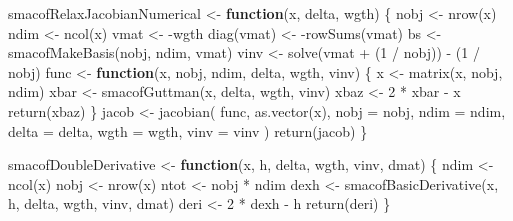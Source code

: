 \documentclass[
  12pt,
  letterpaper,
  DIV=11,
  numbers=noendperiod]{scrartcl}
\newenvironment{Shaded}{\begin{snugshade}}{\end{snugshade}}
\newcommand{\AttributeTok}[1]{\textcolor[rgb]{0.40,0.45,0.13}{#1}}
\newcommand{\ControlFlowTok}[1]{\textcolor[rgb]{0.00,0.23,0.31}{\textbf{#1}}}
\newcommand{\DecValTok}[1]{\textcolor[rgb]{0.68,0.00,0.00}{#1}}
\newcommand{\FunctionTok}[1]{\textcolor[rgb]{0.28,0.35,0.67}{#1}}
\newcommand{\NormalTok}[1]{\textcolor[rgb]{0.00,0.23,0.31}{#1}}
\newcommand{\OtherTok}[1]{\textcolor[rgb]{0.00,0.23,0.31}{#1}}
\newcommand{\SpecialCharTok}[1]{\textcolor[rgb]{0.37,0.37,0.37}{#1}}
\begin{document}
\begin{Shaded}
\begin{Highlighting}[]
\NormalTok{smacofRelaxJacobianNumerical }\OtherTok{\textless{}{-}} \ControlFlowTok{function}\NormalTok{(x, delta, wgth) \{}
\NormalTok{  nobj }\OtherTok{\textless{}{-}} \FunctionTok{nrow}\NormalTok{(x)}
\NormalTok{  ndim }\OtherTok{\textless{}{-}} \FunctionTok{ncol}\NormalTok{(x)}
\NormalTok{  vmat }\OtherTok{\textless{}{-}} \SpecialCharTok{{-}}\NormalTok{wgth}
  \FunctionTok{diag}\NormalTok{(vmat) }\OtherTok{\textless{}{-}} \SpecialCharTok{{-}}\FunctionTok{rowSums}\NormalTok{(vmat)}
\NormalTok{  bs }\OtherTok{\textless{}{-}} \FunctionTok{smacofMakeBasis}\NormalTok{(nobj, ndim, vmat)}
\NormalTok{  vinv }\OtherTok{\textless{}{-}} \FunctionTok{solve}\NormalTok{(vmat }\SpecialCharTok{+}\NormalTok{ (}\DecValTok{1} \SpecialCharTok{/}\NormalTok{ nobj)) }\SpecialCharTok{{-}}\NormalTok{ (}\DecValTok{1} \SpecialCharTok{/}\NormalTok{ nobj)}
\NormalTok{  func }\OtherTok{\textless{}{-}} \ControlFlowTok{function}\NormalTok{(x, nobj, ndim, delta, wgth, vinv) \{}
\NormalTok{    x }\OtherTok{\textless{}{-}} \FunctionTok{matrix}\NormalTok{(x, nobj, ndim)}
\NormalTok{    xbar }\OtherTok{\textless{}{-}} \FunctionTok{smacofGuttman}\NormalTok{(x, delta, wgth, vinv)}
\NormalTok{    xbaz }\OtherTok{\textless{}{-}} \DecValTok{2} \SpecialCharTok{*}\NormalTok{ xbar }\SpecialCharTok{{-}}\NormalTok{ x}
    \FunctionTok{return}\NormalTok{(xbaz)}
\NormalTok{  \}}
\NormalTok{  jacob }\OtherTok{\textless{}{-}} \FunctionTok{jacobian}\NormalTok{(}
\NormalTok{    func,}
    \FunctionTok{as.vector}\NormalTok{(x),}
    \AttributeTok{nobj =}\NormalTok{ nobj,}
    \AttributeTok{ndim =}\NormalTok{ ndim,}
    \AttributeTok{delta =}\NormalTok{ delta,}
    \AttributeTok{wgth =}\NormalTok{ wgth,}
    \AttributeTok{vinv =}\NormalTok{ vinv}
\NormalTok{  )}
  \FunctionTok{return}\NormalTok{(jacob)}
\NormalTok{\}}

\NormalTok{smacofDoubleDerivative }\OtherTok{\textless{}{-}} \ControlFlowTok{function}\NormalTok{(x, h, delta, wgth, vinv, dmat) \{}
\NormalTok{  ndim }\OtherTok{\textless{}{-}} \FunctionTok{ncol}\NormalTok{(x)}
\NormalTok{  nobj }\OtherTok{\textless{}{-}} \FunctionTok{nrow}\NormalTok{(x)}
\NormalTok{  ntot }\OtherTok{\textless{}{-}}\NormalTok{ nobj }\SpecialCharTok{*}\NormalTok{ ndim}
\NormalTok{  dexh }\OtherTok{\textless{}{-}} \FunctionTok{smacofBasicDerivative}\NormalTok{(x, h, delta, wgth, vinv, dmat)}
\NormalTok{  deri }\OtherTok{\textless{}{-}} \DecValTok{2} \SpecialCharTok{*}\NormalTok{ dexh }\SpecialCharTok{{-}}\NormalTok{ h}
  \FunctionTok{return}\NormalTok{(deri)}
\NormalTok{\}}


\end{Highlighting}
\end{Shaded}
\end{document}
